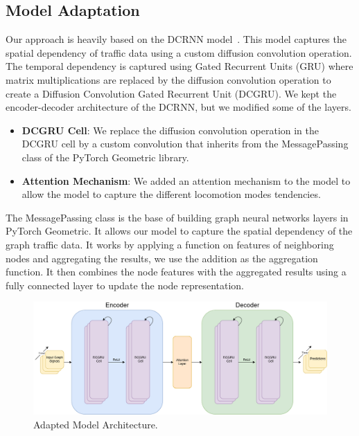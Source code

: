 
\subsection{Model Adaptation}\label{subsec:model-adaptation}
Our approach is heavily based on the DCRNN model~\cite{DCRNN}.
This model captures the spatial dependency of traffic data using a custom diffusion convolution operation.
The temporal dependency is captured using Gated Recurrent Units (GRU) where matrix multiplications are replaced by
the diffusion convolution operation to create a Diffusion Convolution Gated Recurrent Unit (DCGRU).
We kept the encoder-decoder architecture of the DCRNN, but we modified some of the layers.

\begin{itemize}
    \item \textbf{DCGRU Cell}:
    We replace the diffusion convolution operation in the DCGRU cell by a custom convolution that inherits from the MessagePassing class of the PyTorch Geometric library.
    \item \textbf{Attention Mechanism}:
    We added an attention mechanism to the model to allow the model to capture the different locomotion modes tendencies.
\end{itemize}

The MessagePassing class is the base of building graph neural networks layers in PyTorch Geometric.
It allows our model to capture the spatial dependency of the graph traffic data.
It works by applying a function on features of neighboring nodes and aggregating the results, we use the addition as the aggregation function.
It then combines the node features with the aggregated results using a fully connected layer to update the node representation.

\begin{figure}[htbp]
    \centering
    \includegraphics[width=1\textwidth]{resources/model}
    \caption{
        Adapted Model Architecture.
    }
    \label{fig:model}
\end{figure}

